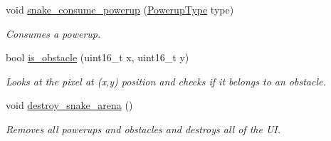 \begin{DoxyCompactItemize}
void \mbox{\hyperlink{group__snake_gac6dab0ed48d449b3a7ab12cb1ce5087c}{snake\+\_\+consume\+\_\+powerup}} (\mbox{\hyperlink{group__snake_gad58f93a5af4c0698fd0b903516c57c31}{Powerup\+Type}} type)
\begin{DoxyCompactList}\small\item\em Consumes a powerup. \end{DoxyCompactList}\item 
bool \mbox{\hyperlink{group__snake_ga0ee9a6018bc0d0ac0ddbe22eec1e5452}{is\+\_\+obstacle}} (uint16\+\_\+t x, uint16\+\_\+t y)
\begin{DoxyCompactList}\small\item\em Looks at the pixel at (x,y) position and checks if it belongs to an obstacle. \end{DoxyCompactList}\item 
void \mbox{\hyperlink{group__snake_ga66cce1d887c5e9e6cfb8e3d1f76ef9a9}{destroy\+\_\+snake\+\_\+arena}} ()
\begin{DoxyCompactList}\small\item\em Removes all powerups and obstacles and destroys all of the UI. \end{DoxyCompactList}\end{DoxyCompactItemize}
